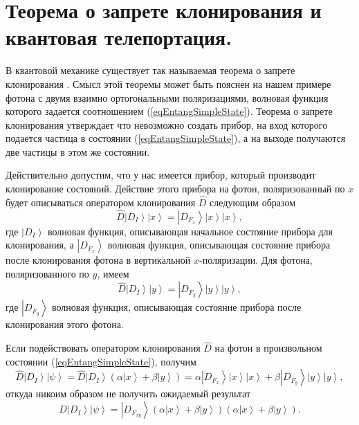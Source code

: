 \section{Теорема о запрете клонирования и квантовая телепортация.}
\label{pPart3EntangleNoClone}
В квантовой механике существует так называемая теорема о запрете
клонирования \cite{bNoClone}. Смысл этой теоремы может быть пояснен на
нашем примере фотона с двумя 
взаимно ортогональными поляризациями, волновая функция которого
задается соотношением (\ref{eqEntangSimpleState}). Теорема о запрете
клонирования  утверждает что невозможно создать прибор, на вход
которого подается частица в состоянии (\ref{eqEntangSimpleState}), 
а на выходе получаются две частицы в этом же состоянии. 

Действительно допустим, что у нас имеется прибор, который производит
клонирование состояний. Действие этого прибора на фотон, поляризованный
по $x$ будет описываться оператором клонирования $\hat{D}$
следующим образом 
\begin{equation}
  \hat{D} \left|D_I\right>\left|x\right> = \left|D_{F_x}\right>\left|x\right>\left|x\right>,
  \nonumber
\end{equation}
где $\left|D_I\right>$ волновая функция, описывающая начальное
состояние прибора для клонирования, а  $\left|D_{F_x}\right>$ волновая
функция, описывающая состояние прибора после клонирования фотона  
в вертикальной $x$-поляризации. Для фотона, поляризованного по $y$, имеем
\begin{equation}
  \hat{D} \left|D_I\right>\left|y\right> = \left|D_{F_y}\right>\left|y\right>\left|y\right>,
  \nonumber
\end{equation}
где $\left|D_{F_y}\right>$ волновая функция, описывающая состояние
прибора после клонирования этого фотона. 

Если подействовать оператором клонирования $\hat{D}$ на фотон в
произвольном состоянии (\ref{eqEntangSimpleState}), получим 
\begin{equation}
  \hat{D} \left|D_I\right>\left|\psi\right> = 
  \hat{D} \left|D_I\right> \left(\alpha \left|x\right> +
  \beta \left|y\right>\right) = 
  \alpha \left|D_{F_x}\right>\left|x\right>\left|x\right> +
  \beta \left|D_{F_y}\right>\left|y\right>\left|y\right>,
  \nonumber
\end{equation}
откуда никоим образом не получить ожидаемый результат
\begin{equation}
  \hat{D} \left|D_I\right>\left|\psi\right> = 
  \left|D_{F_{xy}}\right>  \left(\alpha \left|x\right> +
  \beta \left|y\right>\right)
  \left(\alpha \left|x\right> +
  \beta \left|y\right>\right).
  \nonumber
\end{equation}

